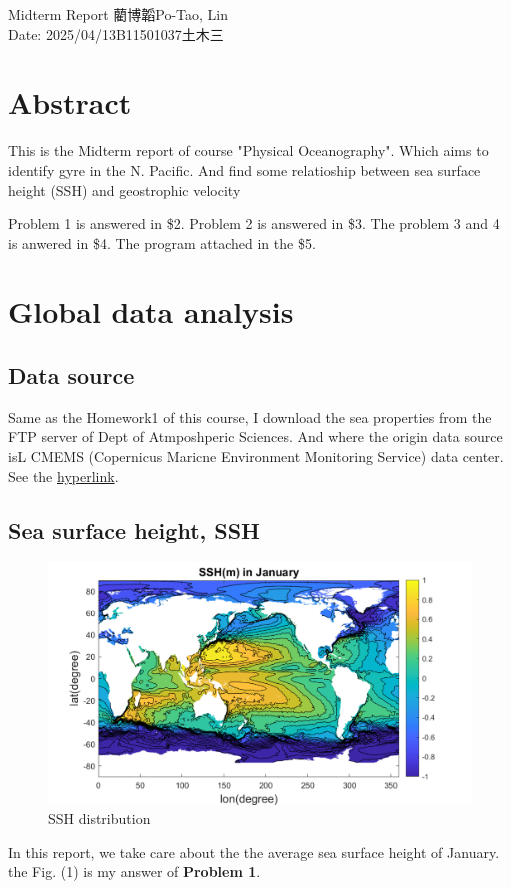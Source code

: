 \documentclass[12pt]{article}
\begin{document}
\begin{CJK*}{UTF8}{bsmi}


\space Midterm Report
\hfill {}藺博韜\space Po-Tao, Lin \\
{ Date: 2025/04/13\hfill\quad B11501037\quad 土木三}

\hrulefill
\section{Abstract}
\qquad This is the Midterm report of course "Physical Oceanography". Which aims to identify gyre in the N. Pacific. And find some relatioship between sea surface height (SSH) and geostrophic velocity\newline 

\quad Problem 1 is answered in \$2. Problem 2 is answered in \$3. The problem 3 and  4 is anwered in \$4. The program attached in the \$5.
\tableofcontents
\newpage
\section{Global data analysis}
\subsection{Data source}
\qquad Same as the Homework1 of this course, I download the sea properties from the FTP server of Dept of Atmposhperic Sciences. And where the origin data source isL CMEMS (Copernicus Maricne Environment Monitoring Service) data center. See the \href{https://data.marine.copernicus.eu/product/GLOBAL_MULTIYEAR_PHY_001_030/files?subdataset=cmems_mod_glo_phy_my_0.083deg-climatology_P1M-m_202311}{hyperlink}.
\subsection{Sea surface height, SSH}
\begin{figure}[h]
 	\centering
	\includegraphics[width=1\textwidth]{Fig1a1.pdf}
	\caption{SSH distribution}
\end{figure}
In this report, we take care about the the average sea surface height of January. the Fig. (1) is my answer of \textbf{Problem 1}.\\


\end{CJK*}
\end{document}
